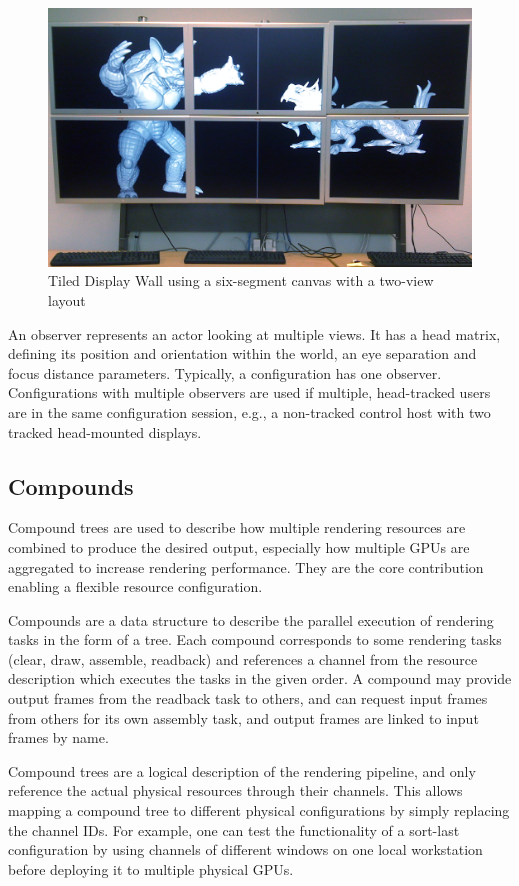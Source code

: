 \begin{figure}[ht!]\center
 \includegraphics[width=.9\textwidth]{images/wallLayout.jpg}
 {\caption{\label{fDisplay}Tiled Display Wall using a six-segment canvas with a two-view layout}}
\end{figure}

An \textsf{observer} represents an actor looking at multiple views. It has a
head matrix, defining its position and orientation within the world, an eye
separation and focus distance parameters. Typically, a configuration has one
observer. Configurations with multiple observers are used if multiple,
head-tracked users are in the same configuration session, e.g., a non-tracked
control host with two tracked head-mounted displays.

\subsection{Compounds}

Compound trees are used to describe how multiple rendering resources are
combined to produce the desired output, especially how multiple GPUs are
aggregated to increase rendering performance. They are the core contribution
enabling a flexible resource configuration.

Compounds are a data structure to describe the parallel execution of rendering
tasks in the form of a tree.  Each compound corresponds to some rendering tasks
(clear, draw, assemble, readback) and references a  channel from the resource
description which executes the tasks in the given order. A compound may provide
output frames from the readback task to others, and can request input
frames from others for its own assembly task, and output frames are linked to
input frames by name.

Compound trees are a logical description of the rendering pipeline, and only
reference the actual physical resources through their channels. This allows
mapping a compound tree to different physical configurations by simply replacing
the channel IDs. For example, one can test the functionality of a sort-last
configuration by using channels of different windows on one local workstation
before deploying it to multiple physical GPUs.

